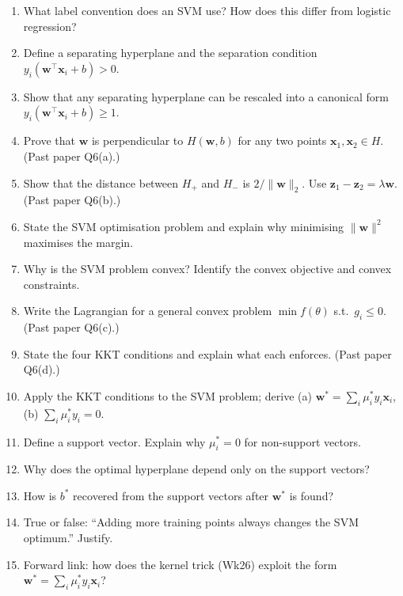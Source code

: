 \documentclass[11pt, a4paper]{article}
\begin{document}
\begin{enumerate}
  \item What label convention does an SVM use? How does this differ from logistic regression?
  \item Define a separating hyperplane and the separation condition $y_i(\mathbf{w}^\top\mathbf{x}_i + b) > 0$.
  \item Show that any separating hyperplane can be rescaled into a canonical form $y_i(\mathbf{w}^\top\mathbf{x}_i + b) \ge 1$.
  \item Prove that $\mathbf{w}$ is perpendicular to $H(\mathbf{w}, b)$ for any two points $\mathbf{x}_1, \mathbf{x}_2 \in H$. (Past paper Q6(a).)
  \item Show that the distance between $H_+$ and $H_-$ is $2/\|\mathbf{w}\|_2$. Use $\mathbf{z}_1 - \mathbf{z}_2 = \lambda\mathbf{w}$. (Past paper Q6(b).)
  \item State the SVM optimisation problem and explain why minimising $\|\mathbf{w}\|^2$ maximises the margin.
  \item Why is the SVM problem convex? Identify the convex objective and convex constraints.
  \item Write the Lagrangian for a general convex problem $\min f(\theta)$ s.t.\ $g_i \le 0$. (Past paper Q6(c).)
  \item State the four KKT conditions and explain what each enforces. (Past paper Q6(d).)
  \item Apply the KKT conditions to the SVM problem; derive (a) $\mathbf{w}^* = \sum_i \mu_i^* y_i \mathbf{x}_i$, (b) $\sum_i \mu_i^* y_i = 0$.
  \item Define a support vector. Explain why $\mu_i^* = 0$ for non-support vectors.
  \item Why does the optimal hyperplane depend only on the support vectors?
  \item How is $b^*$ recovered from the support vectors after $\mathbf{w}^*$ is found?
  \item True or false: ``Adding more training points always changes the SVM optimum.'' Justify.
  \item Forward link: how does the kernel trick (Wk26) exploit the form $\mathbf{w}^* = \sum_i \mu_i^* y_i \mathbf{x}_i$?
\end{enumerate}
\end{document}
